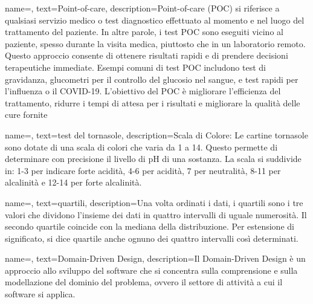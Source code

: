  {
    name=,
    text=Point-of-care,
    description={Point-of-care (POC) si riferisce a qualsiasi servizio medico o test diagnostico effettuato al momento e nel luogo del trattamento del paziente. In altre parole, i test POC sono eseguiti vicino al paziente, spesso durante la visita medica, piuttosto che in un laboratorio remoto. Questo approccio consente di ottenere risultati rapidi e di prendere decisioni terapeutiche immediate. Esempi comuni di test POC includono test di gravidanza, glucometri per il controllo del glucosio nel sangue, e test rapidi per l'influenza o il COVID-19. L'obiettivo del POC è migliorare l'efficienza del trattamento, ridurre i tempi di attesa per i risultati e migliorare la qualità delle cure fornite}
}

 {
    name=,
    text=test del tornasole,
    description={Scala di Colore: Le cartine tornasole sono dotate di una scala di colori che varia da 1 a 14. Questo permette di determinare con precisione il livello di pH di una sostanza. La scala si suddivide in: 1-3 per indicare forte acidità, 4-6 per acidità, 7 per neutralità, 8-11 per alcalinità e 12-14 per forte alcalinità.}
}

 {
    name=,
    text=quartili,
    description={Una volta ordinati i dati, i quartili sono i tre valori che dividono l'insieme dei dati in quattro intervalli di uguale numerosità. Il secondo quartile coincide con la mediana della distribuzione. Per estensione di significato, si dice quartile anche ognuno dei quattro intervalli così determinati.}
}

 {
    name=,
    text=Domain-Driven Design,
    description={Il Domain-Driven Design è un approccio allo sviluppo del software che si concentra sulla comprensione e sulla modellazione del dominio del problema, ovvero il settore di attività a cui il software si applica.}
}